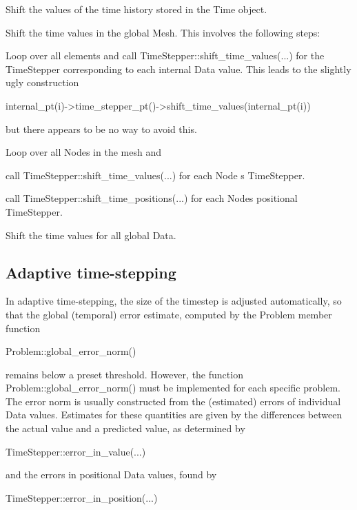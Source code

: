 \begin{DoxyEnumerate}
\item Shift the values of the time history stored in the {\ttfamily Time} object.
\item Shift the time values in the global {\ttfamily Mesh}. This involves the following steps\+:
\begin{DoxyEnumerate}
\item Loop over all elements and call {\ttfamily Time\+Stepper\+::shift\+\_\+time\+\_\+values}(...) for the {\ttfamily Time\+Stepper} corresponding to each internal {\ttfamily Data} value. This leads to the slightly ugly construction
\begin{DoxyCode}
internal\_pt(i)->time\_stepper\_pt()->shift\_time\_values(internal\_pt(i))
\end{DoxyCode}
 but there appears to be no way to avoid this.
\item Loop over all {\ttfamily Nodes} in the mesh and
\begin{DoxyEnumerate}
\item call {\ttfamily Time\+Stepper\+::shift\+\_\+time\+\_\+values}(...) for each {\ttfamily Node} \textquotesingle{}s {\ttfamily Time\+Stepper}.
\item call {\ttfamily Time\+Stepper\+::shift\+\_\+time\+\_\+positions}(...) for each {\ttfamily Node\textquotesingle{}s} positional {\ttfamily Time\+Stepper}.
\end{DoxyEnumerate}
\end{DoxyEnumerate}
\item Shift the time values for all global {\ttfamily Data}.
\end{DoxyEnumerate}\hypertarget{index_adaptive_time_stepping}{}\subsection{Adaptive time-\/stepping}\label{index_adaptive_time_stepping}
In adaptive time-\/stepping, the size of the timestep is adjusted automatically, so that the global (temporal) error estimate, computed by the Problem member function 
\begin{DoxyCode}
Problem::global\_error\_norm() 
\end{DoxyCode}
 remains below a preset threshold. However, the function {\ttfamily Problem\+::global\+\_\+error\+\_\+norm()} must be implemented for each specific problem. The error norm is usually constructed from the (estimated) errors of individual {\ttfamily Data} values. Estimates for these quantities are given by the differences between the actual value and a predicted value, as determined by 
\begin{DoxyCode}
TimeStepper::error\_in\_value(...) 
\end{DoxyCode}
 and the errors in positional {\ttfamily Data} values, found by 
\begin{DoxyCode}
TimeStepper::error\_in\_position(...) 
\end{DoxyCode}


